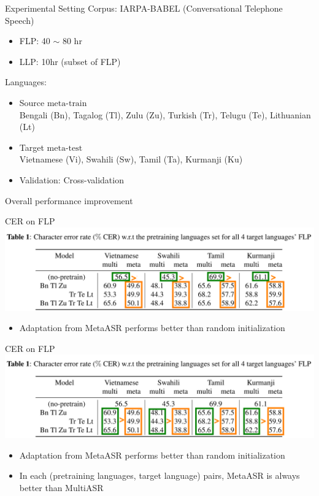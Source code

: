 \documentclass{beamer}
\begin{document}
\begin{frame}[t]{Experimental Setting}
  Corpus: IARPA-BABEL (Conversational Telephone Speech)
  \begin{itemize}
    \item FLP: 40 $\sim$ 80 hr
    \item LLP: 10hr (subset of FLP)
  \end{itemize}
  \pause
  Languages:
  \begin{itemize}
    \item Source $\boxed{\text{meta-train}}$\\ Bengali (Bn), Tagalog (Tl), Zulu (Zu), Turkish (Tr), Telugu (Te), Lithuanian (Lt)
    \item Target $\boxed{\text{meta-test}}$ \\Vietnamese (Vi), Swahili (Sw), Tamil (Ta), Kurmanji (Ku)
    \item Validation: Cross-validation
  \end{itemize}
\end{frame}

\begin{frame}
	\begin{center}
    \LARGE{Overall performance improvement}
	\end{center}
\end{frame}
\begin{frame}[t]{CER on FLP}
  \center \includegraphics[width=1.0\textwidth]{fig/flp-hl1.png}

  \begin{itemize}
    \item Adaptation from MetaASR performs better than random initialization
  \end{itemize}
\end{frame}

\begin{frame}[t]{CER on FLP}
  \center \includegraphics[width=1.0\textwidth]{fig/flp-hl2.png}

  \begin{itemize}
    \item Adaptation from MetaASR performs better than random initialization
    \item In each (pretraining languages, target language) pairs, MetaASR is always better than MultiASR
  \end{itemize}
\end{frame}
\end{document}
